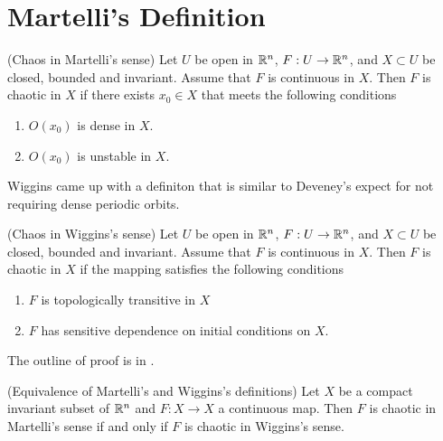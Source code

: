 \documentclass[11pt]{book}
\begin{document}
\section{Martelli's Definition}
\begin{definition}
  (Chaos in Martelli's sense)
  Let $U$ be open in $\mathbb{R}^n$, $F: U \to \mathbb{R}^n$, and $X\subset U$ be closed, bounded and invariant.
  Assume that $F$ is continuous in $X$.
  Then $F$ is chaotic in $X$ if there exists $x_0 \in X$ that meets the following conditions
  \begin{enumerate}
    \item $O(x_0)$ is dense in $X$.
    \item $O(x_0)$ is unstable in $X$.
  \end{enumerate}
  \label{defn:chaosmartelli}
\end{definition}

Wiggins came up with a definiton that is similar to Deveney's expect for not requiring dense periodic orbits.

\begin{definition}
  (Chaos in Wiggins's sense)
   Let $U$ be open in $\mathbb{R}^n$, $F: U \to \mathbb{R}^n$, and $X\subset U$ be closed, bounded and invariant.
  Assume that $F$ is continuous in $X$.
  Then $F$ is chaotic in $X$ if the mapping satisfies the following conditions
  \begin{enumerate}
    \item $F$ is topologically transitive in $X$
    \item $F$ has sensitive dependence on initial conditions on $X$.
  \end{enumerate}
  \label{defn:chaoswiggins}
\end{definition}

The outline of proof is in \cite{martelli98}.
\begin{theorem}
  (Equivalence of Martelli's and Wiggins's definitions)
  Let $X$ be a compact invariant subset of $\mathbb{R}^n$ and $F: X\to X$ a continuous map.
  Then $F$ is chaotic in Martelli's sense if and only if $F$ is chaotic in Wiggins's sense.
  \label{thm:martelliwigginsequiv}
\end{theorem}
\end{document}
